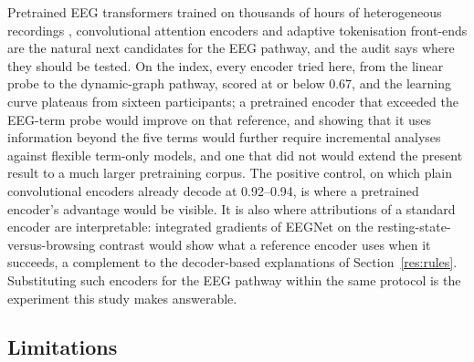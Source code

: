 \documentclass[pdflatex,sn-basic,Numbered,twocolumn,iicol]{sn-jnl}
\theoremstyle{thmstyleone}%
\theoremstyle{thmstyletwo}%
\theoremstyle{thmstylethree}%
\begin{document}
Pretrained EEG transformers trained on thousands of hours of heterogeneous recordings \cite{ref55,ref56}, convolutional attention encoders \cite{ref57} and adaptive tokenisation front-ends \cite{ref58} are the natural next candidates for the EEG pathway, and the audit says where they should be tested. On the index, every encoder tried here, from the linear probe to the dynamic-graph pathway, scored at or below 0.67, and the learning curve plateaus from sixteen participants; a pretrained encoder that exceeded the EEG-term probe would improve on that reference, and showing that it uses information beyond the five terms would further require incremental analyses against flexible term-only models, and one that did not would extend the present result to a much larger pretraining corpus. The positive control, on which plain convolutional encoders already decode at 0.92--0.94, is where a pretrained encoder's advantage would be visible. It is also where attributions of a standard encoder are interpretable: integrated gradients of EEGNet on the resting-state-versus-browsing contrast would show what a reference encoder uses when it succeeds, a complement to the decoder-based explanations of Section~\ref{res:rules}. Substituting such encoders for the EEG pathway within the same protocol is the experiment this study makes answerable.

\subsection{Limitations}\label{disc:limits}
\end{document}
